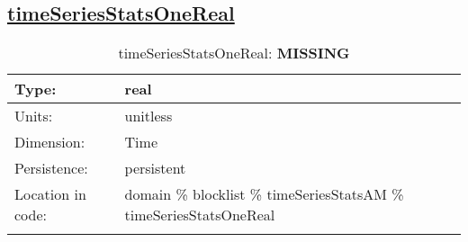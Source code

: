 \subsection[timeSeriesStatsOneReal]{\hyperref[sec:var_tab_timeSeriesStatsAM]{timeSeriesStatsOneReal}}
\label{subsec:var_sec_timeSeriesStatsAM_timeSeriesStatsOneReal}
\begin{center}
\begin{longtable}{| p{2.0in} | p{4.0in} |}
        \hline 
        Type: & real \\
        \hline 
        Units: & \si{unitless} \\
        \hline 
        Dimension: & Time \\
        \hline 
        Persistence: & persistent \\
        \hline 
         Location in code: & domain \% blocklist \% timeSeriesStatsAM \% timeSeriesStatsOneReal \\
         \hline 
    \caption{timeSeriesStatsOneReal: {\bf \color{red} MISSING}}
\end{longtable}
\end{center}
